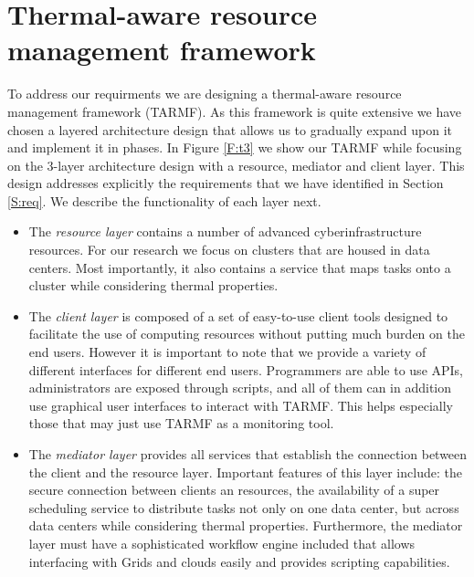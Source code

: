 
\section{Thermal-aware resource management framework}

To address our requirments we are designing a thermal-aware resource management framework (TARMF). As this framework is quite extensive we have chosen a layered architecture design that allows us to gradually expand upon it and implement it in phases.
In Figure \ref{F:t3} we show our TARMF while focusing on the  3-layer architecture design with a resource, mediator and client layer.  This design addresses explicitly the requirements that we have identified in Section \ref{S:req}. We describe the functionality of each layer next.

\begin {itemize}
\item The {\em resource layer} contains a number of advanced cyberinfrastructure resources. For our research we focus on clusters that are housed in data centers. Most importantly, it also contains a service that maps tasks onto a cluster while considering thermal properties.

\item The {\em client layer} is composed of a set of easy-to-use client tools designed to facilitate the use of computing resources without putting much burden on the end users. However it is important to note that we provide a variety of different interfaces for different end users. Programmers are able to use APIs, administrators are exposed through scripts, and all of them can in addition use graphical user interfaces to interact with TARMF. This helps especially those that may just use TARMF as a monitoring tool. 

\item The {\em mediator layer} provides all services that establish the connection between the client and the resource layer. Important features of this layer include: the secure connection between clients an resources, the availability of a super scheduling service to distribute tasks not only on one data center, but across data centers while considering thermal properties. Furthermore, the mediator layer must have a sophisticated workflow engine included that allows interfacing with Grids and clouds easily and provides scripting capabilities.

\end {itemize}

